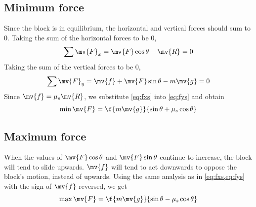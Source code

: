 \subsection{Minimum force}
Since the block is in equilibrium, the horizontal and vertical forces should
sum to \(0\).
Taking the sum of the horizontal forces to be \(0\),
\begin{equation}
  \sum\mv{F}_x=\mv{F}\cos\theta-\mv{R}= 0
  \label{eq:fxs}
\end{equation}
Taking the sum of the vertical forces to be \(0\),
\begin{equation}
  \sum\mv{F}_y = \mv{f} + \mv{F}\sin\theta - m\mv{g} = 0
  \label{eq:fys}
\end{equation}
Since \(\mv{f} = \mu_s\mv{R}\), we substitute \cref{eq:fxs} into
\cref{eq:fys} and obtain
\begin{equation}
  \min\mv{F} = \f{m\mv{g}}{\sin\theta+\mu_s\cos\theta}
\end{equation}
\subsection{Maximum force}
When the values of \(\mv{F}\cos\theta\) and \(\mv{F}\sin\theta\)
continue to increase, the block will tend to slide upwards.
\(\mv{f}\) will tend to act downwards to oppose the block's motion,
instead of upwards. Using the
same analysis as in
\cref{eq:fxs,eq:fys} with the sign of \(\mv{f}\) reversed, we get
\begin{equation}
  \max\mv{F} = \f{m\mv{g}}{\sin\theta-\mu_s\cos\theta}
\end{equation}
